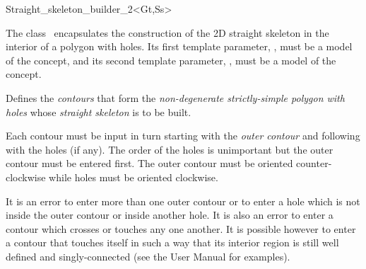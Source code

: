 

\begin{ccRefClass}{Straight_skeleton_builder_2<Gt,Ss>}

\ccDefinition
The class \ccRefName\  encapsulates the construction of the 2D straight skeleton in the interior of a polygon with holes. Its first template parameter, , must be a model of the  concept, and its second template parameter, , must be a model of the  concept.

 
\ccTypes
\ccGlue
\ccGlue

\ccCreation
{}


{Defines the \textit{contours} that form the \textit{non-degenerate strictly-simple polygon with holes} whose \textit{straight skeleton} is to be built. 

Each contour must be input in turn starting with the \textit{outer contour} and following with the holes (if any). The order of the holes is unimportant but the outer contour must be entered first. The outer contour must be oriented counter-clockwise while holes must be oriented clockwise. 

It is an error to enter more than one outer contour or to enter a hole which is not inside the outer contour or inside another hole. It is also an error to enter a contour which crosses or touches any one another. It is possible however to enter a contour that touches itself in such a way that its interior region is still well defined and singly-connected (see the User Manual for examples).

}
\end{ccRefClass}
